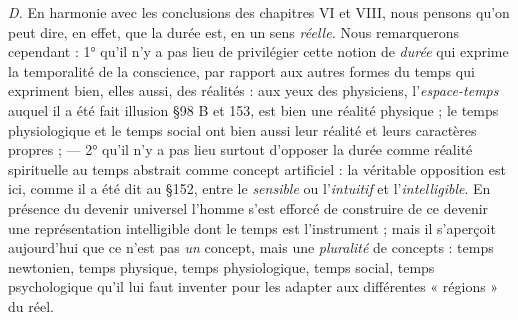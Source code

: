 {\it D.} En harmonie avec les conclusions des chapitres VI et VIII, nous
pensons qu’on peut dire, en effet, que la durée est, en un sens {\it réelle.}
Nous remarquerons cependant : 1° qu’il n’y a pas lieu de privilégier
cette notion de {\it durée} qui exprime la temporalité de la conscience,
par rapport aux autres formes du temps qui expriment bien, elles
aussi, des réalités : aux yeux des physiciens, l’{\it espace-temps} auquel il a
été fait illusion \S 98 B et 153, est bien une réalité physique ; le temps
physiologique et le temps social ont bien aussi leur réalité et leurs
caractères propres ; — 2° qu’il n’y a pas lieu surtout d’opposer la durée
comme réalité spirituelle au temps abstrait comme concept artificiel :
la véritable opposition est ici, comme il a été dit au \S 152, entre le
{\it sensible} ou l’{\it intuitif} et l'{\it intelligible}. En présence du devenir universel
l’homme s’est efforcé de construire de ce devenir une représentation
intelligible dont le temps est l'instrument ; mais il s’aperçoit
aujourd’hui que ce n’est pas {\it un} concept, mais une {\it pluralité} de concepts :
temps newtonien, temps physique, temps physiologique, temps
social, temps psychologique qu’il lui faut inventer pour les adapter
aux différentes « régions » du réel.

